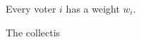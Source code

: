 \documentclass[preview, border={0pt 5pt 3pt 1pt}, varwidth=14cm]{standalone} %
\begin{document}








Every voter \(i\) has a weight \(w_i\).
\vspace{1em}

The collectis







\end{document}
